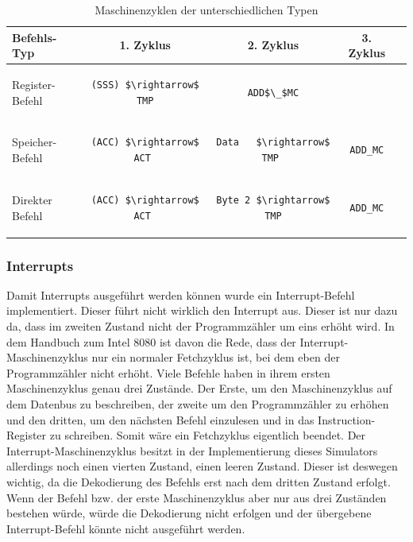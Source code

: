 \documentclass[12pt]{article}
\newcommand{\imgSpaceBefore}{\vspace{10pt}}
\begin{document}
\imgSpaceBefore
\begin{table}[H]
\centering
\begin{tabular}{|l|c|c|c|c| } 
 \hline
 Befehls-Typ & 1. Zyklus & 2. Zyklus & 3. Zyklus \\
 \hline 
 Register-Befehl
 &
 \begin{lstlisting}
(SSS) $\rightarrow$ TMP
 \end{lstlisting}
 &
 \begin{lstlisting}
ADD$\_$MC
 \end{lstlisting}
 & \\
 
 Speicher-Befehl & 
 \begin{lstlisting}
(ACC) $\rightarrow$ ACT 
 \end{lstlisting}  
  & 
 \begin{lstlisting}
Data   $\rightarrow$ TMP 
 \end{lstlisting} 
 & 
 \begin{lstlisting}
ADD_MC
 \end{lstlisting} 
 \\ 
 
 Direkter Befehl & 
 \begin{lstlisting}
(ACC) $\rightarrow$ ACT 
 \end{lstlisting} 
 & 
 \begin{lstlisting}
Byte 2 $\rightarrow$ TMP
 \end{lstlisting} 
 &
  \begin{lstlisting}
ADD_MC
 \end{lstlisting}
 \\
 
 \hline
\end{tabular}
\caption{Maschinenzyklen der unterschiedlichen Typen}
\label{table:mc_types}
\end{table}

\subsubsection{Interrupts}
Damit Interrupts ausgeführt werden können wurde ein Interrupt-Befehl implementiert. Dieser führt nicht wirklich den Interrupt aus. Dieser ist nur dazu da, dass im zweiten Zustand nicht der Programmzähler um eins erhöht wird. In dem Handbuch zum Intel 8080 \cite{IntMan16} ist davon die Rede, dass der Interrupt-Maschinenzyklus nur ein normaler Fetchzyklus ist, bei dem eben der Programmzähler nicht erhöht. Viele Befehle haben in ihrem ersten Maschinenzyklus genau drei Zustände. Der Erste, um den Maschinenzyklus auf dem Datenbus zu beschreiben, der zweite um den Programmzähler zu erhöhen und den dritten, um den nächsten Befehl einzulesen und in das Instruction-Register zu schreiben. Somit wäre ein Fetchzyklus eigentlich beendet. Der Interrupt-Maschinenzyklus besitzt in der Implementierung dieses Simulators allerdings noch einen vierten Zustand, einen leeren Zustand. Dieser ist deswegen wichtig, da die Dekodierung des Befehls erst nach dem dritten Zustand erfolgt. Wenn der Befehl bzw. der erste Maschinenzyklus aber nur aus drei Zuständen bestehen würde, würde die Dekodierung nicht erfolgen und der übergebene Interrupt-Befehl könnte nicht ausgeführt werden.
\end{document}
